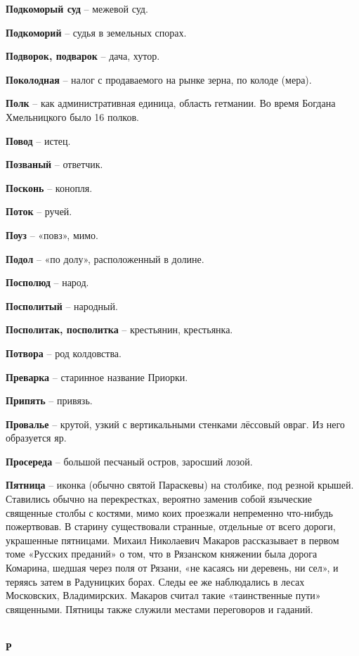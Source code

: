 \begin{multicols}{2}
\textbf{Подкоморый суд} – межевой суд.

\textbf{Подкоморий} – судья в земельных спорах.

\textbf{Подворок, подварок} – дача, хутор. 

\textbf{Поколодная} – налог с продаваемого на рынке зерна, по колоде (мера).

\textbf{Полк} – как административная единица, область гетмании. Во время Богдана Хмельницкого было 16 полков.

\textbf{Повод} – истец.

\textbf{Позваный} – ответчик.

\textbf{Посконь} – конопля.

\textbf{Поток} – ручей.

\textbf{Поуз} – «повз», мимо.

\textbf{Подол} – «по долу», расположенный в долине.

\textbf{Посполюд} – народ.

\textbf{Посполитый} – народный.

\textbf{Посполитак, посполитка} – крестьянин, крестьянка.

\textbf{Потвора} – род колдовства.

\textbf{Преварка} – старинное название Приорки.

\textbf{Припять} – привязь.

\textbf{Провалье} – крутой, узкий с вертикальными стенками лёссовый овраг. Из него образуется яр.

\textbf{Просереда} – большой песчаный остров, заросший лозой.

\textbf{Пятница} – иконка (обычно святой Параскевы) на столбике, под резной крышей. Ставились обычно на перекрестках, вероятно заменив собой языческие священные столбы с костями, мимо коих проезжали непременно что-нибудь пожертвовав. В старину существовали странные, отдельные от всего дороги, украшенные пятницами. Михаил Николаевич Макаров рассказывает в первом томе «Русских преданий» о том, что в Рязанском княжении была дорога Комарина, шедшая через поля от Рязани, «не касаясь ни деревень, ни сел», и теряясь затем в Радуницких борах. Следы ее же наблюдались в лесах Московских, Владимирских. Макаров считал такие «таинственные пути» священными. Пятницы также служили местами переговоров и гаданий.

\mbox{ }\\
\textbf{Р\\}
\mbox{ }\\


\end{multicols}
